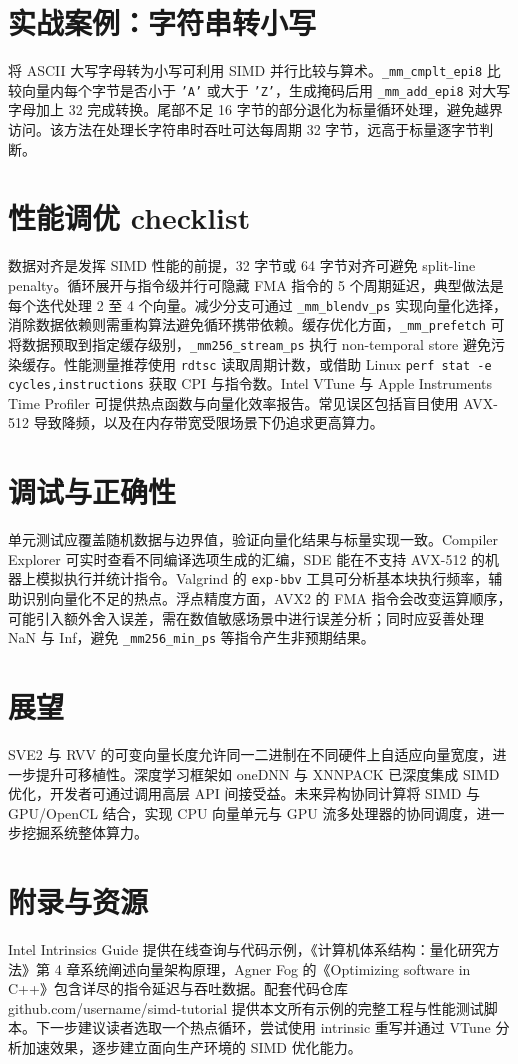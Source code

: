 \chapter{实战案例：字符串转小写}
将 ASCII 大写字母转为小写可利用 SIMD 并行比较与算术。\texttt{\_{}mm\_{}cmplt\_{}epi8} 比较向量内每个字节是否小于 \texttt{'A'} 或大于 \texttt{'Z'}，生成掩码后用 \texttt{\_{}mm\_{}add\_{}epi8} 对大写字母加上 32 完成转换。尾部不足 16 字节的部分退化为标量循环处理，避免越界访问。该方法在处理长字符串时吞吐可达每周期 32 字节，远高于标量逐字节判断。\par
\chapter{性能调优 checklist}
数据对齐是发挥 SIMD 性能的前提，32 字节或 64 字节对齐可避免 split-line penalty。循环展开与指令级并行可隐藏 FMA 指令的 5 个周期延迟，典型做法是每个迭代处理 2 至 4 个向量。减少分支可通过 \texttt{\_{}mm\_{}blendv\_{}ps} 实现向量化选择，消除数据依赖则需重构算法避免循环携带依赖。缓存优化方面，\texttt{\_{}mm\_{}prefetch} 可将数据预取到指定缓存级别，\texttt{\_{}mm256\_{}stream\_{}ps} 执行 non-temporal store 避免污染缓存。性能测量推荐使用 \texttt{rdtsc} 读取周期计数，或借助 Linux \texttt{perf stat -e cycles,instructions} 获取 CPI 与指令数。Intel VTune 与 Apple Instruments Time Profiler 可提供热点函数与向量化效率报告。常见误区包括盲目使用 AVX-512 导致降频，以及在内存带宽受限场景下仍追求更高算力。\par
\chapter{调试与正确性}
单元测试应覆盖随机数据与边界值，验证向量化结果与标量实现一致。Compiler Explorer 可实时查看不同编译选项生成的汇编，SDE 能在不支持 AVX-512 的机器上模拟执行并统计指令。Valgrind 的 \texttt{exp-bbv} 工具可分析基本块执行频率，辅助识别向量化不足的热点。浮点精度方面，AVX2 的 FMA 指令会改变运算顺序，可能引入额外舍入误差，需在数值敏感场景中进行误差分析；同时应妥善处理 NaN 与 Inf，避免 \texttt{\_{}mm256\_{}min\_{}ps} 等指令产生非预期结果。\par
\chapter{展望}
SVE2 与 RVV 的可变向量长度允许同一二进制在不同硬件上自适应向量宽度，进一步提升可移植性。深度学习框架如 oneDNN 与 XNNPACK 已深度集成 SIMD 优化，开发者可通过调用高层 API 间接受益。未来异构协同计算将 SIMD 与 GPU/OpenCL 结合，实现 CPU 向量单元与 GPU 流多处理器的协同调度，进一步挖掘系统整体算力。\par
\chapter{附录与资源}
Intel Intrinsics Guide 提供在线查询与代码示例，《计算机体系结构：量化研究方法》第 4 章系统阐述向量架构原理，Agner Fog 的《Optimizing software in C++》包含详尽的指令延迟与吞吐数据。配套代码仓库 github.com/username/simd-tutorial 提供本文所有示例的完整工程与性能测试脚本。下一步建议读者选取一个热点循环，尝试使用 intrinsic 重写并通过 VTune 分析加速效果，逐步建立面向生产环境的 SIMD 优化能力。\par
